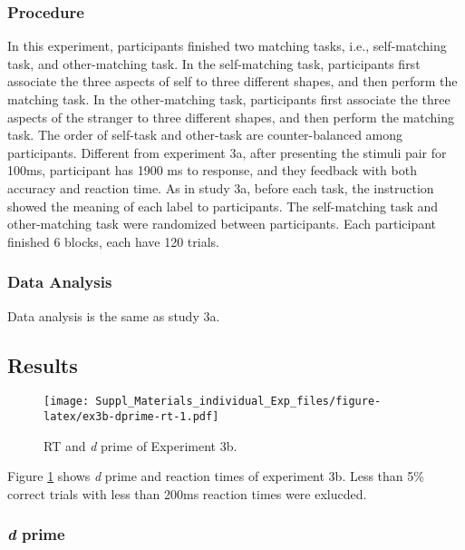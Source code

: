 \documentclass[
  english,
  man]{apa6}
\begin{document}
\hypertarget{procedure-5}{%
\subsubsection{Procedure}\label{procedure-5}}

In this experiment, participants finished two matching tasks, i.e., self-matching task, and other-matching task. In the self-matching task, participants first associate the three aspects of self to three different shapes, and then perform the matching task. In the other-matching task, participants first associate the three aspects of the stranger to three different shapes, and then perform the matching task. The order of self-task and other-task are counter-balanced among participants.
Different from experiment 3a, after presenting the stimuli pair for 100ms, participant has 1900 ms to response, and they feedback with both accuracy and reaction time.
As in study 3a, before each task, the instruction showed the meaning of each label to participants. The self-matching task and other-matching task were randomized between participants. Each participant finished 6 blocks, each have 120 trials.

\hypertarget{data-analysis-4}{%
\subsubsection{Data Analysis}\label{data-analysis-4}}

Data analysis is the same as study 3a.

\hypertarget{results-5}{%
\subsection{Results}\label{results-5}}

\begin{figure}
\centering
\texttt{[image: Suppl\_Materials\_individual\_Exp\_files/figure-latex/ex3b-dprime-rt-1.pdf]}
\caption{\label{fig:ex3b-dprime-rt}RT and \emph{d} prime of Experiment 3b.}
\end{figure}

Figure \ref{fig:ex3b-dprime-rt} shows \emph{d} prime and reaction times of experiment 3b. Less than 5\% correct trials with less than 200ms reaction times were exlucded.

\hypertarget{d-prime-3}{%
\subsubsection{\texorpdfstring{\emph{d} prime}{d prime}}\label{d-prime-3}}
\end{document}
